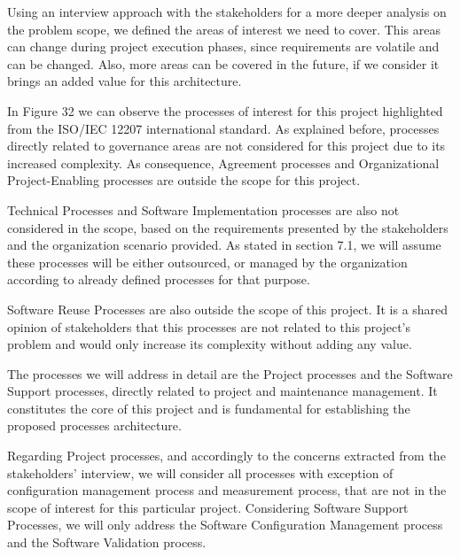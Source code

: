 Using an interview approach with the stakeholders for a more deeper analysis on the problem scope, we defined the areas of interest we need to cover. This areas can change during project execution phases, since requirements are volatile and can be changed. Also, more areas can be covered in the future, if we consider it brings an added value for this architecture.\par
In Figure 32 we can observe the processes of interest for this project highlighted from the ISO/IEC 12207 international standard. As explained before, processes directly related to governance areas are not considered for this project due to its increased complexity. As consequence, Agreement processes and Organizational Project-Enabling processes are outside the scope for this project.\par
Technical Processes and Software Implementation processes are also not considered in the scope, based on the requirements presented by the stakeholders and the organization scenario provided. As stated in section 7.1, we will assume these processes will be either outsourced, or managed by the organization according to already defined processes for that purpose.\par
Software Reuse Processes are also outside the scope of this project. It is a shared opinion of stakeholders that this processes are not related to this project's problem and would only increase its complexity without adding any value.\par
The processes we will address in detail are the Project processes and the Software Support processes, directly related to project and maintenance management. It constitutes the core of this project and is fundamental for establishing the proposed processes architecture.\par
Regarding Project processes, and accordingly to the concerns extracted from the stakeholders' interview, we will consider all processes with exception of configuration management process and measurement process, that are not in the scope of interest for this particular project. Considering Software Support Processes, we will only address the Software Configuration Management process and the Software Validation process.\par


